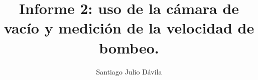 \documentclass[final,5p,times,twocolumn, nopreprintline]{elsarticle}
\numberwithin{equation}{section}
\begin{document}
\begin{frontmatter}



\title{Informe 2: uso de la cámara de vacío y medición de la velocidad de bombeo.}


\author[first]{Santiago Julio Dávila}






\end{frontmatter}
\end{document}
